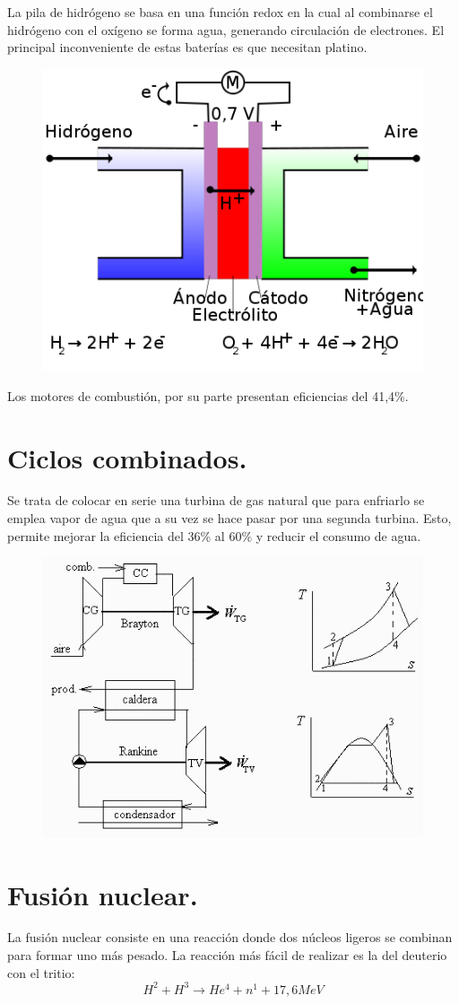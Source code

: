 La pila de hidrógeno se basa en una función redox en la cual al combinarse el hidrógeno con el oxígeno se forma agua, generando circulación de electrones. El principal inconveniente de estas baterías es que necesitan platino.
\begin{figure}[H]
	\centering
	\includegraphics[width=0.68\linewidth]{res/tema3/hidrogeno2}
	\label{fig:hidrogeno2}
\end{figure}
Los motores de combustión, por su parte presentan eficiencias del 41,4\%.
\section{Ciclos combinados.}
Se trata de colocar en serie una turbina de gas natural que para enfriarlo se emplea vapor de agua que a su vez se hace pasar por una segunda turbina. Esto, permite mejorar la eficiencia del 36\% al 60\% y reducir el consumo de agua.
\begin{figure}[H]
	\centering
	\includegraphics[width=0.7\linewidth]{res/tema3/ciclocombinao2}
	\label{fig:ciclocombinao2}
\end{figure}


\section{Fusión nuclear.}
La fusión nuclear consiste en una reacción donde dos núcleos ligeros se combinan para formar uno más pesado. La reacción más fácil de realizar es la del deuterio con el tritio:
\[H^2+H^3\rightarrow He^4 +n^1 + 17,6MeV\]

